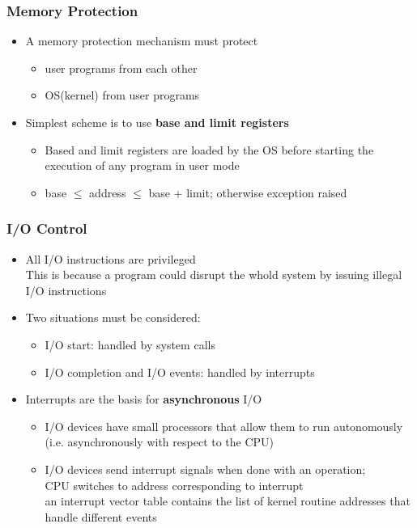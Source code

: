 \documentclass[11pt]{article}
\theoremstyle{definition}
\begin{document}
        \subsubsection{Memory Protection}
            \begin{itemize}
                \item A memory protection mechanism must protect
                    \begin{itemize}
                        \item user programs from each other
                        \item OS(kernel) from user programs
                    \end{itemize}
                \item Simplest scheme is to use \textbf{base and limit registers}
                    \begin{itemize}
                        \item Based and limit registers are loaded by the OS before starting the execution of any program in user mode
                        \item base $\leq$ address $\le$ base + limit; otherwise exception raised
                    \end{itemize}
            \end{itemize}
        \subsubsection{I/O Control}
            \begin{itemize}
                \item All I/O instructions are privileged \\ \hspace{1cm} This is because a program could disrupt the whold system by issuing illegal I/O instructions
                \item Two situations must be considered:
                    \begin{itemize}
                        \item I/O start: handled by system calls
                        \item I/O completion and I/O events: handled by interrupts
                    \end{itemize}
                \item Interrupts are the basis for \textbf{asynchronous} I/O
                    \begin{itemize}
                        \item I/O devices have small processors that allow them to run autonomously (i.e. asynchronously with respect to the CPU)
                        \item I/O devices send interrupt signals when done with an operation; \\
                        CPU switches to address corresponding to interrupt
                        \\ an interrupt vector table contains the list of kernel routine addresses that handle different events
                    \end{itemize}
            \end{itemize}
\end{document}

